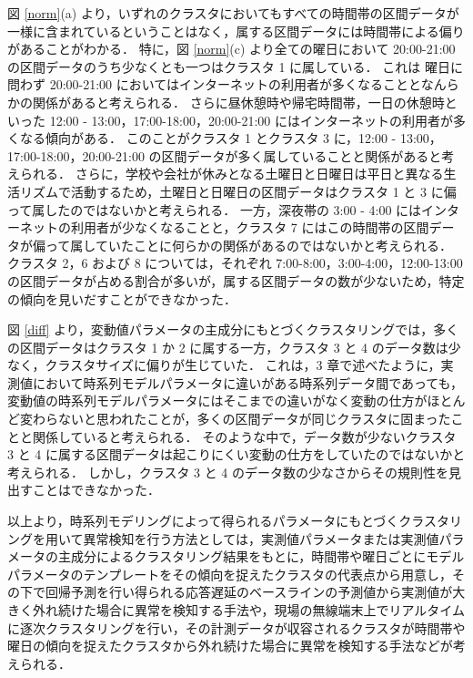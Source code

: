 \documentclass[technicalreport]{ieicej}
\begin{document}
図 \ref{norm}(a) より，いずれのクラスタにおいてもすべての時間帯の区間データが一様に含まれているということはなく，属する区間データには時間帯による偏りがあることがわかる．
特に，図 \ref{norm}(c) より全ての曜日において 20:00-21:00 の区間データのうち少なくとも一つはクラスタ 1 に属している．
これは 曜日に問わず 20:00-21:00 においてはインターネットの利用者が多くなることとなんらかの関係があると考えられる．
さらに昼休憩時や帰宅時間帯，一日の休憩時といった 12:00 - 13:00，17:00-18:00，20:00-21:00 にはインターネットの利用者が多くなる傾向がある．
このことがクラスタ 1 とクラスタ 3 に，12:00 - 13:00，17:00-18:00，20:00-21:00 の区間データが多く属していることと関係があると考えられる．
さらに，学校や会社が休みとなる土曜日と日曜日は平日と異なる生活リズムで活動するため，土曜日と日曜日の区間データはクラスタ 1 と 3 に偏って属したのではないかと考えられる．
一方，深夜帯の 3:00 - 4:00 にはインターネットの利用者が少なくなることと，クラスタ 7 にはこの時間帯の区間データが偏って属していたことに何らかの関係があるのではないかと考えられる．
クラスタ 2，6 および 8 については，それぞれ 7:00-8:00，3:00-4:00，12:00-13:00 の区間データが占める割合が多いが，属する区間データの数が少ないため，特定の傾向を見いだすことができなかった．

図 \ref{diff} より，変動値パラメータの主成分にもとづくクラスタリングでは，多くの区間データはクラスタ 1 か 2 に属する一方，クラスタ 3 と 4 のデータ数は少なく，クラスタサイズに偏りが生じていた．
これは，3 章で述べたように，実測値において時系列モデルパラメータに違いがある時系列データ間であっても，変動値の時系列モデルパラメータにはそこまでの違いがなく変動の仕方がほとんど変わらないと思われたことが，多くの区間データが同じクラスタに固まったことと関係していると考えられる．
そのような中で，データ数が少ないクラスタ 3 と 4 に属する区間データは起こりにくい変動の仕方をしていたのではないかと考えられる．
しかし，クラスタ 3 と 4 のデータ数の少なさからその規則性を見出すことはできなかった．

以上より，時系列モデリングによって得られるパラメータにもとづくクラスタリングを用いて異常検知を行う方法としては，実測値パラメータまたは実測値パラメータの主成分によるクラスタリング結果をもとに，時間帯や曜日ごとにモデルパラメータのテンプレートをその傾向を捉えたクラスタの代表点から用意し，その下で回帰予測を行い得られる応答遅延のベースラインの予測値から実測値が大きく外れ続けた場合に異常を検知する手法や，現場の無線端末上でリアルタイムに逐次クラスタリングを行い，その計測データが収容されるクラスタが時間帯や曜日の傾向を捉えたクラスタから外れ続けた場合に異常を検知する手法などが考えられる．
\end{document}
